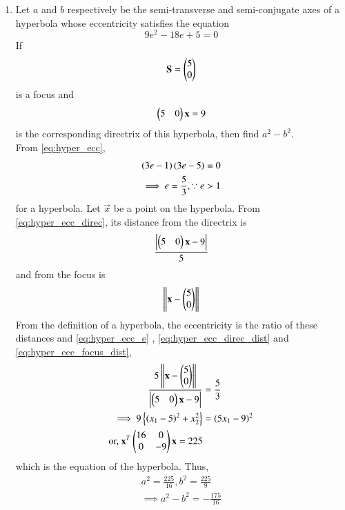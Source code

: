 \begin{enumerate}[label=\arabic*.,ref=\thesubsection.\theenumi]
\item Let $a$ and $b$ respectively be the semi-transverse and semi-conjugate axes of a hyperbola whose 
eccentricity satisfies the equation
\begin{equation}
\label{eq:hyper_ecc}
9e^2-18e+5 = 0
\end{equation}
If 
\begin{equation} 
\label{eq:hyper_ecc_focus}
\mathbf{S}=\begin{pmatrix}5\\ 0\end{pmatrix}
\end{equation}
is a focus and 
\begin{equation} 
\label{eq:hyper_ecc_direc}
\begin{pmatrix}5 & 0\end{pmatrix}\mathbf{x} = 9
\end{equation} 
%
is the corresponding directrix of this hyperbola, then find $a^2-b^2$.
\\
\solution From \eqref{eq:hyper_ecc},
\begin{align}
\left(3e-1\right)\left(3e-5\right) = 0
\\
\implies e = \frac{5}{3}, \because e > 1
\label{eq:hyper_ecc_e}
\end{align}
%
for a hyperbola.  
Let $\vec{x}$ be a point on the hyperbola.  
From \eqref{eq:hyper_ecc_direc}, its distance from the directrix is
%
\begin{align}
\label{eq:hyper_ecc_direc_dist}
\frac{\left\vert\begin{pmatrix}5 & 0\end{pmatrix}\mathbf{x} - 9\right\vert}{5}
\end{align}
%
and from the focus is 
\begin{align}
\label{eq:hyper_ecc_focus_dist}
\left\lVert\mathbf{x}-\begin{pmatrix}5\\0\end{pmatrix}\right\rVert
\end{align}
From the definition of a hyperbola, the eccentricity is the ratio of these distances and \eqref{eq:hyper_ecc_e}
, \eqref{eq:hyper_ecc_direc_dist}
 and \eqref{eq:hyper_ecc_focus_dist},
\begin{align}
\frac{5\left\lVert\mathbf{x}-\begin{pmatrix}5\\0\end{pmatrix}\right\rVert}{\left\vert\begin{pmatrix}5 & 0\end{pmatrix}\mathbf{x} - 9\right\vert} &= \frac{5}{3}
\\
\implies 9\left\{\left(x_1-5\right)^2+x_2^2\right\}&=  \left(5x_1-9\right)^2
\\
\text{or, } \mathbf{x}^T\begin{pmatrix}16 & 0 \\ 0 & -9\end{pmatrix}\mathbf{x} = 225
\end{align}
%
which is the equation of the hyperbola.  Thus, 
\begin{align}
a^2 = \frac{225}{16}, b^2 = \frac{225}{9}
\\
\implies a^2-b^2 = -\frac{175}{16}
\end{align}



\end{enumerate}

